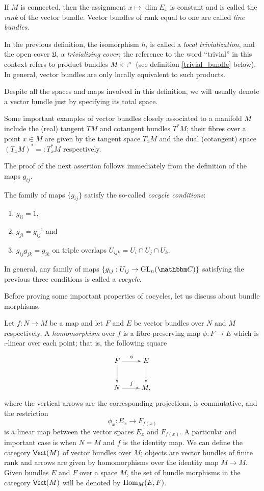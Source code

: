 If $M$ is connected, then the assignment $x\mapsto \dim E_x$ is
constant and is called the \emph{rank} of the vector bundle. Vector
bundles of rank equal to one are called \emph{line bundles}.

In the previous definition, the isomorphism $h_i$ is called a
\emph{local trivialization}, and the open cover $\mathfrak{U}$, a
\emph{trivializing cover}; the reference to the word ``trivial'' in
this context refers to product bundles $M\times \comp^n$ (see
definition \ref{trivial_bundle} below). In general, vector bundles are
only locally equivalent to such products.

Despite all the spaces and maps involved in this definition, we will
usually denote a vector bundle just by specifying its total space.

\begin{ej}
  Some important examples of vector bundles closely associated to a
  manifold $M$ include the (real) tangent $TM$ and cotangent bundles
  $T^*M$; their fibres over a point $x\in M$ are given by the tangent
  space $T_xM$ and the dual (cotangent) space $(T_xM)^*=:T^*_xM$
  respectively.
\end{ej}

The proof of the next assertion follows immediately from the
definition of the maps $g_{ij}$.

\begin{pyd}\label{cocycle}
  The family of maps $\{g_{ij}\}$ satisfy the so-called \emph{cocycle
    conditions}:
  \begin{enumerate}
  \item $g_{ii}=1$,
  \item $g_{ji}=g_{ij}^{-1}$ and
  \item $g_{ij}g_{jk}=g_{ik}$ on triple overlaps
    $U_{ijk}=U_i\cap U_j\cap U_k$.
  \end{enumerate}
  In general, any family of maps
  $\{g_{ij}:U_{ij}\to \opnm{GL}_n(\comp )\}$ satisfying the previous
  three conditions is called a \emph{cocycle}.
\end{pyd}

Before proving some important properties of cocycles, let us discuss
about bundle morphisms.

Let $f:N\to M$ be a map and let $F$ and $E$ be vector bundles over $N$
and $M$ respectively. A \emph{homomorphism} over $f$ is a
fibre-preserving map $\phi:F\to E$ which is $\comp$-linear over each
point; that is, the following square
$$\xymatrix{
  F\ar[r]^\phi \ar[d] & E \ar[d] \\
  N \ar[r]^f & M,}
$$
where the vertical arrows are the corresponding projections, is
commutative, and the restriction
$$\phi_x:E_x\longrightarrow F_{f(x)}$$
is a linear map between the vector spaces $E_x$ and $F_{f(x)}$. A
particular and important case is when $N=M$ and $f$ is the identity
map. We can define the category $\mathsf{Vect}(M)$ of vector bundles over
$M$; objects are vector bundles of finite rank and arrows are given by
homomorphisms over the identity map $M\to M$. Given bundles $E$ and
$F$ over a space $M$, the set of bundle morphisms in the category
$\mathsf{Vect}(M)$ will be denoted by $\operatorname{Hom}_M(E,F)$.

